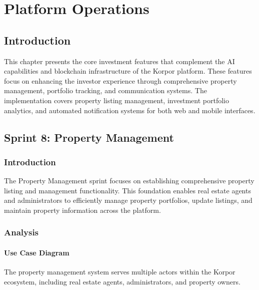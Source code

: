 \chapter{Platform Operations}


\section*{Introduction}

This chapter presents the core investment features that complement the AI capabilities and blockchain infrastructure of the Korpor platform. These features focus on enhancing the investor experience through comprehensive property management, portfolio tracking, and communication systems. The implementation covers property listing management, investment portfolio analytics, and automated notification systems for both web and mobile interfaces.

\section{Sprint 8: Property Management}

\subsection{Introduction}
The Property Management sprint focuses on establishing comprehensive property listing and management functionality. This foundation enables real estate agents and administrators to efficiently manage property portfolios, update listings, and maintain property information across the platform.

\subsection{Analysis}
\subsubsection{Use Case Diagram}
The property management system serves multiple actors within the Korpor ecosystem, including real estate agents, administrators, and property owners.


